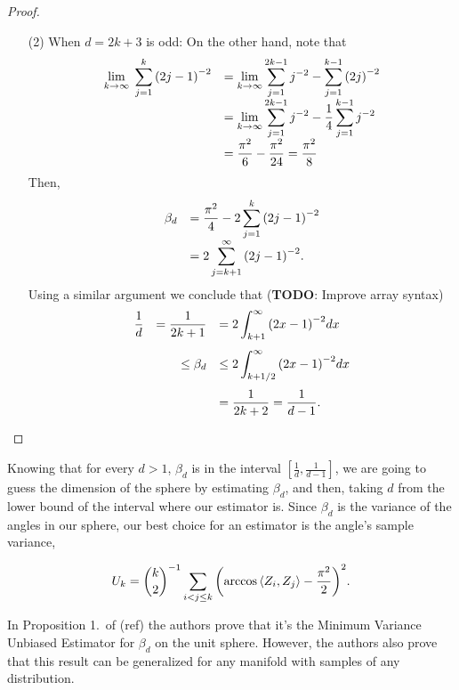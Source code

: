 \documentclass[12pt]{exam}
\theoremstyle{remark}
\newcommand{\angles}[1]{\ensuremath{\left\langle}#1\ensuremath{\right\rangle} }
\begin{document}
\begin{proof}
\begin{enumerate}
    \item[(2)] When $d = 2k+3$ is odd:
    On the other hand, note that
    \[\everymath{\displaystyle} 
      \begin{array}{rl}
      \lim_{k\to\infty} \; \sum_{j = 1}^{k} {(2j-1)}^{-2} 
      & = \lim_{k\to\infty} \sum_{j = 1}^{2k-1} j^{-2} - \sum_{j = 1}^{k-1} {(2j)}^{-2}\\
      & = \lim_{k\to\infty} \sum_{j = 1}^{2k-1} j^{-2} - \frac{1}{4}\sum_{j = 1}^{k-1} j^{-2}\\
      & = \frac{\pi^2}{6}-\frac{\pi^2}{24} = \frac{\pi^2}{8}
    \end{array}\]
    Then,
    \[\everymath{\displaystyle}
    \begin{array}{rl}
      \beta_d & = \frac{\pi^2}{4} - 2 \sum_{j = 1}^{k} {\left(2j-1\right)}^{-2}\\
      & = 2\sum_{j = k+1}^{\infty}{\left(2j-1\right)}^{-2}.\\
    \end{array}      
   \]
   Using a similar argument we conclude that (\textbf{TODO}: Improve array syntax)
   \[\everymath{\displaystyle} 
      \begin{array}{rrl}
        \frac{1}{d}& = \frac{1}{2k+1}  & = 2 \int_{k+1}^{\infty}{(2x-1)}^{-2} dx\\[5mm]
      & \leq \beta_d    & \leq  2 \int_{k+1/2}^{\infty}{(2x-1)}^{-2} dx\\[5mm]
      &  & = \frac{1}{2k+2} = \frac{1}{d-1}.
    \end{array}  \] 
  \end{enumerate}
\end{proof}

Knowing that for every $d > 1$, $\beta_d$ is in the interval $[\tfrac{1}{d}, \tfrac{1}{d-1}]$, we are going to guess the dimension of the sphere by estimating $\beta_d$, and then, taking $d$ from the lower bound of the interval where our estimator is. Since $\beta_d$ is the variance of the angles in our sphere, our best choice for an estimator is the angle's sample variance,


\begin{equation}\label{ade:2}
  U_{k} = \binom{k}{2}^{-1} \sum_{i<j\leq k}{\left(
    \arccos\angles{Z_i, Z_j} - \frac{\pi^2}{2} 
    \right)}^{2}.
\end{equation}

In Proposition 1.\ of (ref) the authors prove that it's the Minimum Variance Unbiased Estimator for $\beta_d$ on the unit sphere. However, the authors also prove that this result can be generalized for any manifold with samples of any distribution.\\[5mm]
\end{document}
